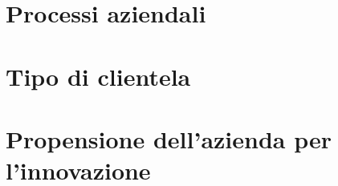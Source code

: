 \section{Processi aziendali}

\section{Tipo di clientela}

\section{Propensione dell'azienda per l'innovazione}

